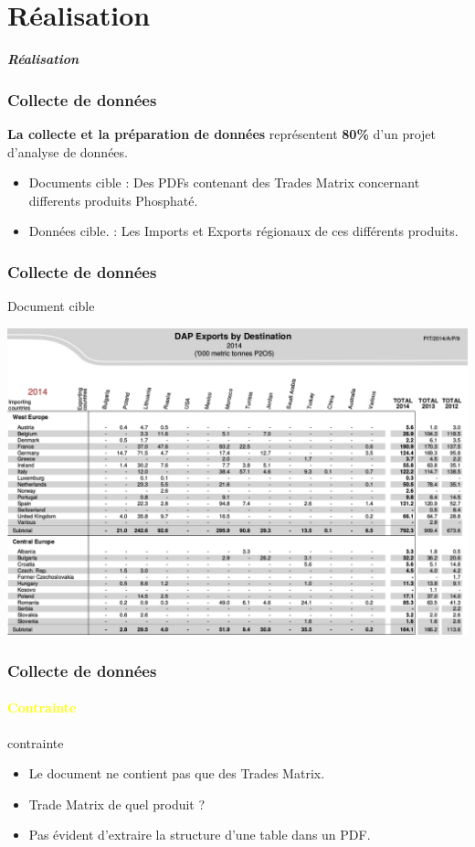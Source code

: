 \documentclass{beamer}
\begin{document}
\section{Réalisation}

\begin{frame}
	\begin{center}
		\Huge \textbf{\textit{Réalisation}}
	\end{center}
\end{frame}

\begin{frame}
  \frametitle{Collecte de données}
  \textbf{La collecte et la préparation de données} représentent \textbf{80\%} d'un projet d'analyse de données.\\
  \begin{itemize}
    \item Documents cible : Des PDFs contenant des Trades Matrix concernant differents produits Phosphaté.
    \item Données cible. : Les Imports et Exports régionaux de ces différents produits.
  \end{itemize}
\end{frame}

\begin{frame}
  \frametitle{Collecte de données}
	\begin{block}{Document cible}
    		\begin{center}
    		\includegraphics[width=\textwidth, height=0.7\textheight, keepaspectratio]{DocIFA}
    		\end{center}
	\end{block}
\end{frame}

\begin{frame}
  \frametitle{Collecte de données}
  \framesubtitle{\textbf{\textcolor{yellow}{Contrainte}}}
  \begin{block}{contrainte}
  	\begin{itemize}
    		\item Le document ne contient pas que des Trades Matrix.
    		\item Trade Matrix de quel produit ?
    		\item Pas évident d'extraire la structure d'une table dans un PDF.
  	\end{itemize}
  \end{block}
\end{frame}
\end{document}
